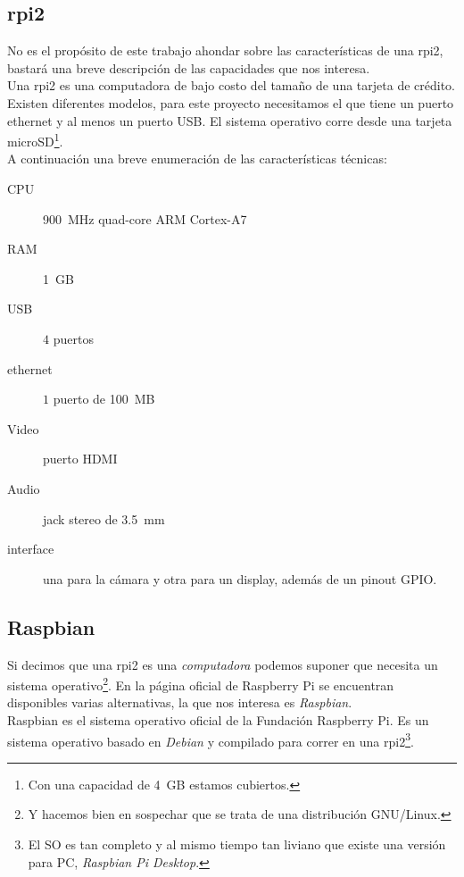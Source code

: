 \documentclass[10pt,a4paper]{article}
\begin{document}
\subsection{rpi2}

No es el prop\'osito de este trabajo ahondar sobre las caracter\'isticas de una rpi2, bastar\'a una breve descripci\'on de las capacidades que nos interesa.\\

Una rpi2 es una computadora de bajo costo del tama\~no de una tarjeta de cr\'edito. Existen diferentes modelos, para este proyecto necesitamos el que tiene un puerto ethernet y al menos un puerto USB. El sistema operativo corre desde una tarjeta microSD\footnote{Con una capacidad de \SI{4}{GB} estamos cubiertos.}.\\

A continuaci\'on una breve enumeraci\'on de las caracter\'isticas t\'ecnicas:
\begin{description}
    \item[CPU] \SI{900}{MHz} quad-core ARM Cortex-A7
    \item[RAM] \SI{1}{GB}
    \item[USB] $4$ puertos
    \item[ethernet] $1$ puerto de \SI{100}{MB}
    \item[Video] puerto HDMI
    \item[Audio] jack stereo de \SI{3,5}{mm}
    \item[interface] una para la c\'amara y otra para un display, adem\'as de un pinout GPIO.
\end{description}

\subsection{Raspbian}

Si decimos que una rpi2 es una \emph{computadora} podemos suponer que necesita un sistema operativo\footnote{Y hacemos bien en sospechar que se trata de una distribuci\'on GNU/Linux.}. En la p\'agina oficial de Raspberry Pi se encuentran disponibles varias alternativas, la que nos interesa es \emph{Raspbian}.\\

Raspbian es el sistema operativo oficial de la Fundaci\'on Raspberry Pi. Es un sistema operativo basado en \emph{Debian} y compilado para correr en una rpi2\footnote{El SO es tan completo y al mismo tiempo tan liviano que existe una versi\'on para PC, \emph{Raspbian Pi Desktop}.}.\\
\end{document}
